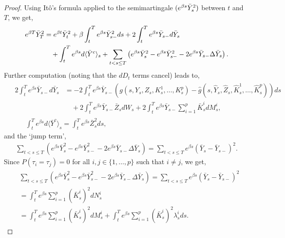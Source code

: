 \documentclass[10pt,a4paper]{amsart}
\begin{document}
\begin{proof}
    Using It\^o's formula applied to the semimartingale $(e^{\beta s}\Bar{Y}_s^2)$ between $t$ and $T$, we get,
    \begin{align}\label{eq:peProof1}
        \begin{aligned}
            e^{\beta T}\Bar{Y}_T^2 &= e^{\beta t}\Bar{Y}_t^2 + \beta\int_t^Te^{\beta s}\bar{Y}_{s-}^2ds + 2\int_t^Te^{\beta s}\Bar{Y}_{s-}d\bar{Y}_s \\&\quad+\int_t^Te^{\beta s}d\langle\bar{Y}^c\rangle_s + \sum_{t<s\le T}\left(e^{\beta s}\bar{Y}_s^2-e^{\beta s}\bar{Y}_{s-}^2 - 2e^{\beta s}\bar{Y}_{s-}\Delta\bar{Y}_s\right).
            \end{aligned}
    \end{align}
 	Further computation (noting that the $dD_t$ terms cancel) leads to,
    \begin{align}
        &\begin{aligned}\label{eq:peProof2}
        2\int_t^Te^{\beta s}\bar{Y}_{s-}d\bar{Y}_{s} &= -2\int_t^Te^{\beta s}\bar{Y}_{s-}(g(s,Y_s,Z_s,K_s^1,\ldots,K_s^p) - \hat{g}(s,\hat{Y}_s,\hat{Z}_s,\hat{K}_s^1,\ldots,\hat{K}_s^p))ds \\
        &\quad+ 2\int_t^Te^{\beta s}\bar{Y}_{s-}\bar{Z}_sdW_s + 2\int_t^Te^{\beta s}\bar{Y}_{s-}\sum_{i=1}^p\bar{K}_s^idM_s^i,
        \end{aligned}\\
        \label{eq:peProof3}
        &\quad\quad\int_t^Te^{\beta s}d\langle\bar{Y}^c\rangle_s = \int_t^Te^{\beta s}\bar{Z}_s^2ds,
    \end{align}
    and the `jump term',
    \begin{align*}
        \sum_{t<s\le T}\left(e^{\beta s}\bar{Y}_s^2-e^{\beta s}\bar{Y}_{s-}^2 - 2e^{\beta s}\bar{Y}_{s-}\Delta\bar{Y}_s\right) = \sum_{t<s\le T}e^{\beta s}(\bar{Y}_s - \bar{Y}_{s-})^2.
    \end{align*}
    Since $P(\tau_i = \tau_j) = 0$ for all $i,j\in\{1,\ldots,p\}$ such that $i\ne j$, we get,
    \begin{align}\label{eq:peProof4}
        \begin{aligned}
            &\sum_{t<s\le T}(e^{\beta s}\bar{Y}_s^2-e^{\beta s}\bar{Y}_{s-}^2 - 2e^{\beta s}\bar{Y}_{s-}\Delta\bar{Y}_s) = \sum_{t<s\le T}e^{\beta s}(\bar{Y}_s - \bar{Y}_{s-})^2\\
	      &= \int_t^Te^{\beta s}\sum_{i=1}^p(\bar{K}_s^i)^2dN_s^i\\
            &= \int_t^Te^{\beta s}\sum_{i=1}^p(\bar{K}_s^i)^2dM_s^i + \int_t^Te^{\beta s}\sum_{i=1}^p(\bar{K}_s^i)^2\lambda_s^ids.

\end{aligned}
\end{align}
\end{proof}
\end{document}

